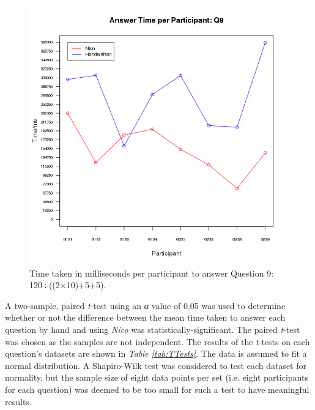\documentclass[12pt,twoside,notitlepage,xetex]{report}
\begin{document}
\begin{center}
\begin{figure}[H]
\begin{center}
\includegraphics[width=\textwidth-2cm]{figs/graphs/q9.png}
\end{center}
\caption{Time taken in milliseconds per participant to answer Question 9: 120÷((2×10)+5+5).}
\label{fig:PlotQ9}
\end{figure}
\end{center}

A two-sample, paired \emph{t}-test using an \emph{α} value of 0.05 was used to
determine whether or not the difference between the mean time taken to answer
each question by hand and using \emph{Nico} was statistically-significant.  The
paired \emph{t}-test was chosen as the samples are not independent.  The
results of the \emph{t}-tests on each question's datasets are shown in
\emph{Table \ref{tab:TTests}}.  The data is assumed to fit a normal distribution.  A
Shapiro-Wilk test was considered to test each dataset for normality, but the
sample size of eight data points per set (i.e. eight participants for each
question) was deemed to be too small for such a test to have meaningful results.
\end{document}
